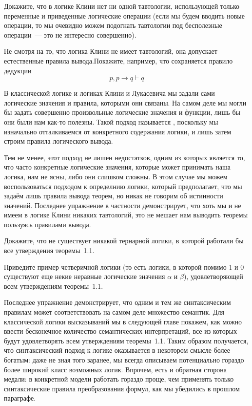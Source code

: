 \begin{exercise}
Докажите, что в логике Клини нет ни одной тавтологии, использующей только переменные и приведенные логические операции (если мы будем вводить новые операции, то мы очевидно можем подогнать тавтологии под бесполезные операции~--- это не интересно совершенно).
\end{exercise}

\begin{exercise}
Не смотря на то, что логика Клини не имеет тавтологий, она допускает естественные правила вывода.Покажите, например, что сохраняется правило дедукции
$$p, p\to q\vdash q$$
\end{exercise}

В классической логике и логиках Клини и Лукасевича мы задали сами логические значения и правила, которыми они связаны. На самом деле мы могли бы задать совершенно произвольные логические значения и функции, лишь бы они были нам как-то полезны. Такой подход называется , поскольку мы изначально отталкиваемся от конкретного содержания логики, и лишь затем строим правила логического вывода.

Тем не менее, этот подход не лишен недостатков, одним из которых является то, что часто конкретные логические значения, которые может принимать наша логика, нам не ясны, либо они слишком сложны. В этом случае мы можем воспользоваться  подходом к определнию логики, который предполагает, что мы задаём лишь правила вывода теорем, но никак не говорим об истинности значений. Последнее упражнение в частности демонстрирует, что хоть мы и не имеем в логике Клини никаких тавтологий, это не мешает нам выводить теоремы пользуясь правилами вывода.

\begin{exercise}
Докажите, что не существует никакой тернарной логики, в которой работали бы все утверждения теоремы~1.1.
\end{exercise}

\begin{exercise}
Приведите пример четверичной логики (то есть логики, в которой помимо 1 и 0 существуют еще некие неравные логические значения $\alpha$ и $\beta$), удовлетворяющей всем утверждениям теоремы~1.1.
\end{exercise}

Последнее упражнение демонстрирует, что одним и тем же синтаксическим правилам может соответствовать на самом деле множество семантик. Для классической логики высказываний мы в следующей главе покажем, как можно ввести бесконечное количество семантических интерпретаций, все из которых будут удовлетворять всем утверждениям теоремы~1.1. Таким образом получается, что синтаксический подход к логике оказывается в некотором смысле более богатым: даже не зная того заранее, мы всегда описываем потенциально гораздо более широкий класс возможных логик. Впрочем, есть и обратная сторона медали: в конкретной модели работать гораздо проще, чем применять только синтаксические правила преобразования формул, как мы убедились в прошлом параграфе.

